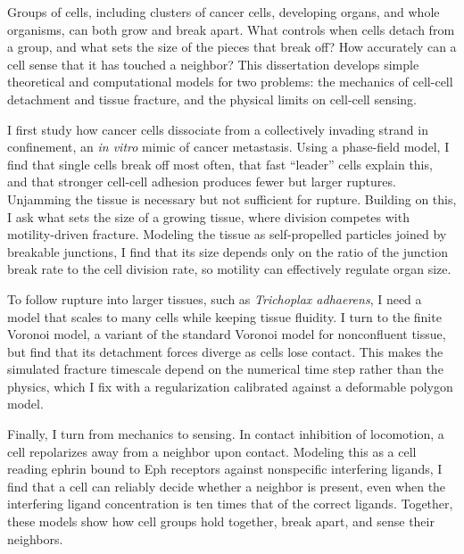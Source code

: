 {\def\ChapterFont{\LARGE\bfseries\singlespacing}}


{\large
Groups of cells, including clusters of cancer cells, developing organs, and whole organisms, can both grow and break apart.
What controls when cells detach from a group, and what sets the size of the pieces that break off?
How accurately can a cell sense that it has touched a neighbor?
This dissertation develops simple theoretical and computational models for two problems: the mechanics of cell-cell detachment and tissue fracture, and the physical limits on cell-cell sensing.

I first study how cancer cells dissociate from a collectively invading strand in confinement, an \textit{in vitro} mimic of cancer metastasis.
Using a phase-field model, I find that single cells break off most often, that fast ``leader'' cells explain this, and that stronger cell-cell adhesion produces fewer but larger ruptures.
Unjamming the tissue is necessary but not sufficient for rupture.
Building on this, I ask what sets the size of a growing tissue, where division competes with motility-driven fracture.
Modeling the tissue as self-propelled particles joined by breakable junctions, I find that its size depends only on the ratio of the junction break rate to the cell division rate, so motility can effectively regulate organ size.

To follow rupture into larger tissues, such as \textit{Trichoplax adhaerens}, I need a model that scales to many cells while keeping tissue fluidity.
I turn to the finite Voronoi model, a variant of the standard Voronoi model for nonconfluent tissue, but find that its detachment forces diverge as cells lose contact.
This makes the simulated fracture timescale depend on the numerical time step rather than the physics, which I fix with a regularization calibrated against a deformable polygon model.

Finally, I turn from mechanics to sensing.
In contact inhibition of locomotion, a cell repolarizes away from a neighbor upon contact.
Modeling this as a cell reading ephrin bound to Eph receptors against nonspecific interfering ligands, I find that a cell can reliably decide whether a neighbor is present, even when the interfering ligand concentration is ten times that of the correct ligands.
Together, these models show how cell groups hold together, break apart, and sense their neighbors.
}



